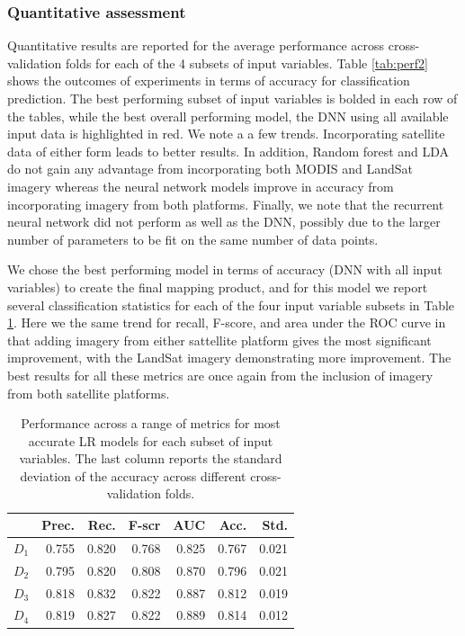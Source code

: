 \documentclass{article} %
\begin{document}
\subsubsection{Quantitative assessment} \label{sec:res1}
Quantitative results are reported for the average performance across cross-validation folds for each of the 4 subsets of input variables. Table \ref{tab:perf2} shows the outcomes of experiments in terms of accuracy for classification prediction. 
The best performing subset of input variables is bolded in each row of the tables, while the best overall performing model, the DNN using all available input data is highlighted in red. We note a a few trends. Incorporating satellite data of either form leads to better results. In addition, Random forest and LDA do not gain any advantage from incorporating both MODIS and LandSat imagery whereas the neural network models improve in accuracy from incorporating imagery from both platforms. Finally, we note that the recurrent neural network did not perform as well as the DNN, possibly due to the larger number of parameters to be fit on the same number of data points.

We chose the best performing model in terms of accuracy (DNN with all input variables) to create the final mapping product, and for this model we report several classification statistics for each of the four input variable subsets in Table \ref{tab:dnnperf}. Here we the same trend for recall, F-score, and area under the ROC curve in that adding imagery from either sattellite platform gives the most significant improvement, with the LandSat imagery demonstrating more improvement. The best results for all these metrics are once again from the inclusion of imagery from both satellite platforms.

 
\begin{table}
\begin{tabularx}{\linewidth}{l r r r r r r}
		\toprule[.2em]
		 &{\bf Prec.}& {\bf Rec.}&{\bf F-scr}&{\bf AUC}&{\bf Acc.}&{\bf Std.}\\
		\midrule
		$D_1$&0.755&0.820&0.768&0.825&0.767&0.021\\
		$D_2$&0.795&0.820&0.808&0.870&0.796&0.021\\
		$D_3$&0.818&0.832&0.822&0.887&0.812&0.019\\
		$D_4$&0.819& 0.827&0.822&0.889&0.814&0.012\\
		\bottomrule[.2em]
	\end{tabularx}
	\caption{Performance across a range of metrics for most accurate LR models for each subset of input variables. The last column reports the standard deviation of the accuracy across different cross-validation folds.} \label{tab:dnnperf}
\end{table}
\end{document}
